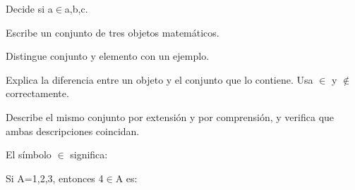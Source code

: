 \begin{activity}[id=dia-14-corta-04,type=short,weight=1]

Decide si a\(\in\){a,b,c}.

\end{activity}

\begin{activity}[id=dia-14-corta-05,type=short,weight=1]

Escribe un conjunto de tres objetos matemáticos.

\end{activity}

\begin{activity}[id=dia-14-corta-06,type=short,weight=1]

Distingue conjunto y elemento con un ejemplo.

\end{activity}

\begin{activity}[id=dia-14-desarrollo-01,type=long,weight=2]

Explica la diferencia entre un objeto y el conjunto que lo contiene. Usa \(\in\) y \(\notin\) correctamente.

\end{activity}

\begin{activity}[id=dia-14-desarrollo-02,type=long,weight=2]

Describe el mismo conjunto por extensión y por comprensión, y verifica que ambas descripciones coincidan.

\end{activity}

\begin{activity}[id=dia-14-opcion-01,type=choice,weight=1]

El símbolo \(\in\) significa:





\end{activity}

\begin{activity}[id=dia-14-opcion-02,type=choice,weight=1]

Si A={1,2,3}, entonces 4\(\in\)A es:





\end{activity}

